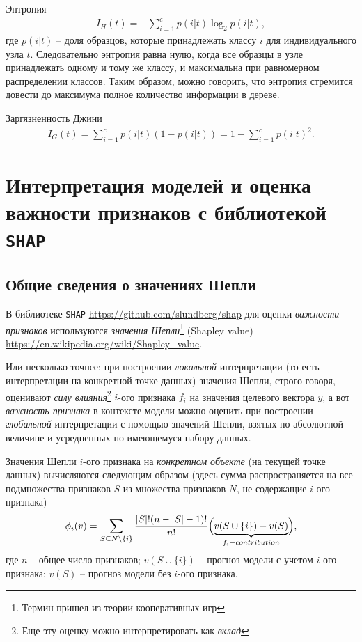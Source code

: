 \documentclass[%
	11pt,
	a4paper,
	utf8,
		]{article}
\begin{document}
Энтропия
\begin{align*}
	I_H(t) = - \sum_{i=1}^{c} p(i|t) \log_2 p(i|t),
\end{align*}
где $ p(i|t) $ -- доля образцов, которые принадлежать классу $ i $ для индивидуального узла $ t $. Следовательно энтропия равна нулю, когда все образцы в узле принадлежать одному и тому же классу, и максимальна при равномерном распределении классов. Таким образом, можно говорить, что энтропия стремится довести до максимума полное количество информации в дереве.

Заргязненность Джини
\begin{align*}
	I_G(t) = \sum_{i=1}^{c} p(i|t)(1 - p(i|t)) = 1 - \sum_{i=1}^{c} p(i|t)^2.
\end{align*}


\section{Интерпретация моделей и оценка важности признаков с библиотекой \texttt{SHAP}}

\subsection{Общие сведения о значениях Шепли}

В библиотеке \texttt{SHAP} \url{https://github.com/slundberg/shap} для оценки \emph{важности признаков} используются \emph{значения Шепли}\footnote{Термин пришел из теории кооперативных игр} (Shapley value) \url{https://en.wikipedia.org/wiki/Shapley_value}.

Или несколько точнее: при построении \emph{локальной} интерпретации (то есть интерпретации на конкретной точке данных) значения Шепли, строго говоря, оценивают \emph{силу влияния}\footnote{Еще эту оценку можно интерпретировать как \emph{вклад}} $ i $-ого признака $ f_i $ на значения целевого вектора $ y $, а вот \emph{важность признака} в контексте модели можно оценить при построении \emph{глобальной} интерпретации с помощью значений Шепли, взятых по абсолютной величине и усредненных по имеющемуся набору данных. 


Значения Шепли $i$-ого признака на \emph{конкретном объекте} (на текущей точке данных) вычисляются следующим образом (здесь сумма распространяется на все подмножества признаков $ S $ из множества признаков $ N $, не содержащие $ i $-ого признака)
\begin{align*}
\phi_i(v) = \sum_{S \subseteq N\setminus\{i\}} \dfrac{|S|!(n - |S| - 1)!}{n!}\Bigl( \underset{f_i-contribution }{\underbrace{ v(S \cup \{i\}) - v(S)}} \Bigr),
\end{align*}
где $ n $ -- общее число признаков; $ v(S \cup \{i\}) $ -- прогноз модели с учетом $ i $-ого признака; $ v(S) $ -- прогноз модели без $ i $-ого признака.
\end{document}
